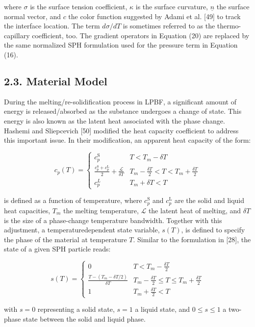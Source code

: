 \documentclass[10pt]{article}
\begin{document}
where $\sigma$ is the surface tension coefficient, $\kappa$ is the surface curvature, $\underline{n}$ the surface normal vector, and $c$ the color function suggested by Adami et al. [49] to track the interface location. The term $d \sigma / d T$ is sometimes referred to as the thermo-capillary coefficient, too. The gradient operators in Equation (20) are replaced by the same normalized SPH formulation used for the pressure term in Equation (16).

\subsection*{2.3. Material Model}
During the melting/re-solidification process in LPBF, a significant amount of energy is released/absorbed as the substance undergoes a change of state. This energy is also known as the latent heat associated with the phase change. Hashemi and Sliepcevich [50] modified the heat capacity coefficient to address this important issue. In their modification, an apparent heat capacity of the form:

\[
c_{p}(T)= \begin{cases}c_{p}^{\mathrm{S}} & T<T_{m}-\delta T  \tag{21}\\ \frac{c_{p}^{\mathrm{S}}+c_{p}^{\mathrm{L}}}{2}+\frac{\mathscr{L}}{\delta T} & T_{m}-\frac{\delta T}{2}<T<T_{m}+\frac{\delta T}{2} \\ c_{p}^{L} & T_{m}+\delta T<T\end{cases}
\]

is defined as a function of temperature, where $c_{p}^{\mathrm{S}}$ and $c_{p}^{\mathrm{L}}$ are the solid and liquid heat capacities, $T_{m}$ the melting temperature, $\mathscr{L}$ the latent heat of melting, and $\delta T$ is the size of a phase-change temperature bandwidth. Together with this adjustment, a temperaturedependent state variable, $s(T)$, is defined to specify the phase of the material at temperature $T$. Similar to the formulation in [28], the state of a given SPH particle reads:

\[
s(T)= \begin{cases}0 & T<T_{m}-\frac{\delta T}{2}  \tag{22}\\ \frac{T-\left(T_{m}-\delta T / 2\right)}{\delta T} & T_{m}-\frac{\delta T}{2} \leq T \leq T_{m}+\frac{\delta T}{2} \\ 1 & T_{m}+\frac{\delta T}{2}<T\end{cases}
\]

with $s=0$ representing a solid state, $s=1$ a liquid state, and $0 \leq s \leq 1$ a two-phase state between the solid and liquid phase.
\end{document}
